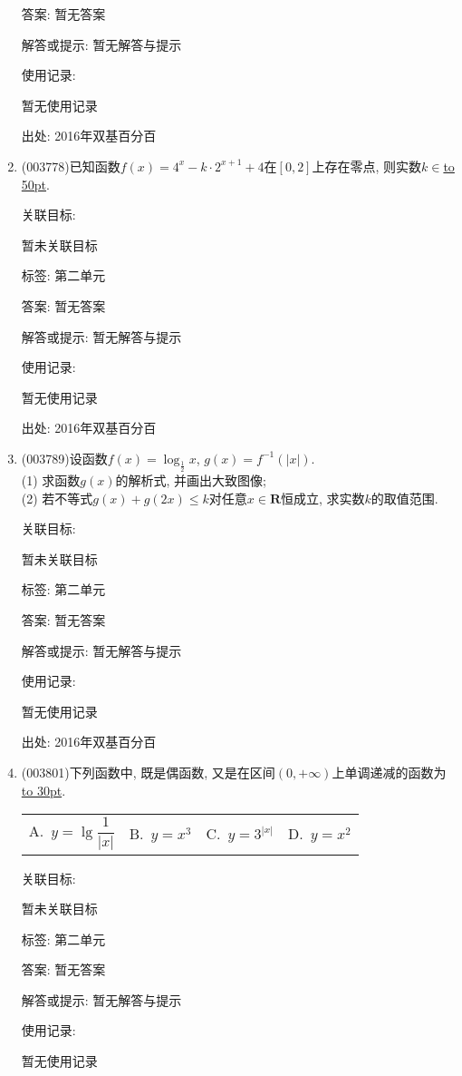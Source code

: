\documentclass[10pt,a4paper]{article}
\newcommand{\blank}[1]{\underline{\hbox to #1pt{}}}
\newcommand{\fourch}[4]{\par\begin{tabular}{p{.23\textwidth}p{.23\textwidth}p{.23\textwidth}p{.23\textwidth}}
A.~#1 &B.~#2& C.~#3& D.~#4
\end{tabular}}
\begin{document}
\begin{enumerate}[1.]
答案: 暂无答案

解答或提示: 暂无解答与提示

使用记录:

暂无使用记录


出处: 2016年双基百分百
\item { (003778)}已知函数$f(x)=4^x-k\cdot 2^{x+1}+4$在$[0,2]$上存在零点, 则实数$k\in$\blank{50}.


关联目标:

暂未关联目标



标签: 第二单元

答案: 暂无答案

解答或提示: 暂无解答与提示

使用记录:

暂无使用记录


出处: 2016年双基百分百
\item { (003789)}设函数$f(x)=\log_\frac 12 x$, $g(x)=f^{-1}(|x|)$.\\
(1) 求函数$g(x)$的解析式, 并画出大致图像;\\
(2) 若不等式$g(x)+g(2x)\le k$对任意$x\in \mathbf{R}$恒成立, 求实数$k$的取值范围.


关联目标:

暂未关联目标



标签: 第二单元

答案: 暂无答案

解答或提示: 暂无解答与提示

使用记录:

暂无使用记录


出处: 2016年双基百分百
\item { (003801)}下列函数中, 既是偶函数, 又是在区间$(0,+\infty)$上单调递减的函数为\blank{30}.
\fourch{$y=\lg\dfrac{1}{|x|}$}{$y=x^3$}{$y=3^{|x|}$}{$y=x^2$}


关联目标:

暂未关联目标



标签: 第二单元

答案: 暂无答案

解答或提示: 暂无解答与提示

使用记录:

暂无使用记录



\end{enumerate}
\end{document}
